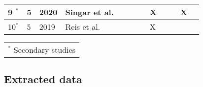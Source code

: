 \begin{table}[h]
\begin{tabularx}{\textwidth}{|l|l|X|l|l|l|l|l|l|l|l|l|}
    9 $^{\ast}$ & 5                       & 2020          & Singar et al.~\cite[]{role_of_cyber_security_in_higher_edu_2020} &           &            &            & X         &            &            & X         \\\hline
    10$^{\ast}$ & 5                       & 2019          & Reis et al.~\cite[]{telepresence_robots_in_classroom_2019}       &            &            &            & X         &            &            &               \\\hline
  \end{tabularx}
  \begin{tabularx}{\textwidth}{@{}l}
    \footnotesize{$^{\ast}$ Secondary studies}\\
  \end{tabularx}
\end{table}

\subsection{Extracted data}\label{subsec:extracted-data}

